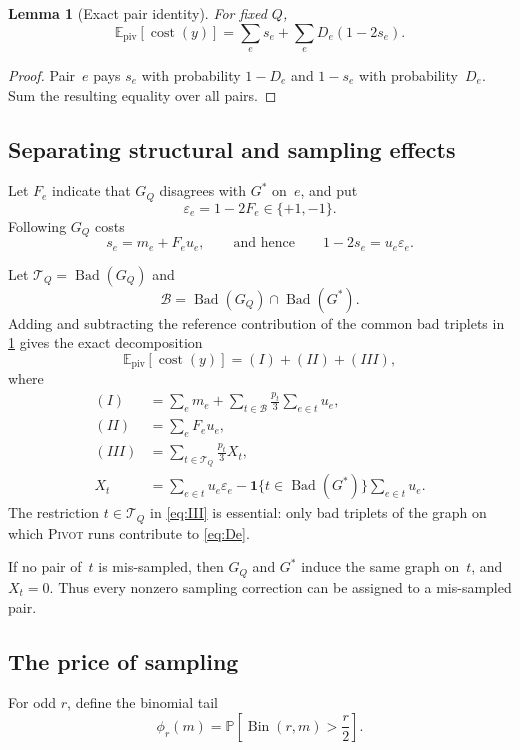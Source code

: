 \documentclass[11pt,letterpaper]{article}
\newtheorem{lemma}[theorem]{Lemma}
\theoremstyle{definition}
\theoremstyle{remark}
\newcommand{\cost}{\operatorname{cost}}
\newcommand{\Bad}{\operatorname{Bad}}
\newcommand{\E}{\mathbb{E}}
\newcommand{\Prb}{\mathbb{P}}
\newcommand{\1}{\mathbf{1}}
\newcommand{\eps}{\varepsilon}
\newcommand{\calB}{\mathcal{B}}
\newcommand{\calT}{\mathcal{T}}
\newcommand{\Pivot}{\textnormal{\textsc{Pivot}}}
\begin{document}
\begin{lemma}[Exact pair identity]\label{lem:exact}
For fixed $Q$,
\[
 \E_{\mathrm{piv}}[\cost(y)]
 =\sum_e s_e+\sum_eD_e(1-2s_e).
\]
\end{lemma}

\begin{proof}
Pair~$e$ pays $s_e$ with probability $1-D_e$ and $1-s_e$ with probability~$D_e$.  Sum the resulting equality over all pairs.
\end{proof}

\subsection{Separating structural and sampling effects}

Let $F_e$ indicate that $G_Q$ disagrees with $G^*$ on~$e$, and put
\[
 \eps_e=1-2F_e\in\{+1,-1\}.
\]
Following $G_Q$ costs
\[
 s_e=m_e+F_eu_e,
 \qquad\text{and hence}\qquad
 1-2s_e=u_e\eps_e.
\]

Let $\calT_Q=\Bad(G_Q)$ and
\[
 \calB=\Bad(G_Q)\cap\Bad(G^*).
\]
Adding and subtracting the reference contribution of the common bad triplets in \cref{lem:exact} gives the exact decomposition
\begin{equation}\label{eq:decomposition}
 \E_{\mathrm{piv}}[\cost(y)]=(I)+(II)+(III),
\end{equation}
where
\begin{align}
 (I)&=\sum_em_e+
 \sum_{t\in\calB}\frac{p_t}{3}\sum_{e\in t}u_e,
 \label{eq:I}\\
 (II)&=\sum_eF_eu_e,
 \label{eq:II}\\
 (III)&=\sum_{t\in\calT_Q}\frac{p_t}{3}X_t,
 \label{eq:III}\\
 X_t&=\sum_{e\in t}u_e\eps_e
 -\1\{t\in\Bad(G^*)\}\sum_{e\in t}u_e.
 \label{eq:Xt}
\end{align}
The restriction $t\in\calT_Q$ in \cref{eq:III} is essential: only bad triplets of the graph on which \Pivot{} runs contribute to \cref{eq:De}.

If no pair of~$t$ is mis-sampled, then $G_Q$ and $G^*$ induce the same graph on~$t$, and $X_t=0$.  Thus every nonzero sampling correction can be assigned to a mis-sampled pair.

\subsection{The price of sampling}

For odd $r$, define the binomial tail
\[
 \phi_r(m)=\Prb\!\left[\operatorname{Bin}(r,m)>\frac r2\right].
\]
\end{document}
